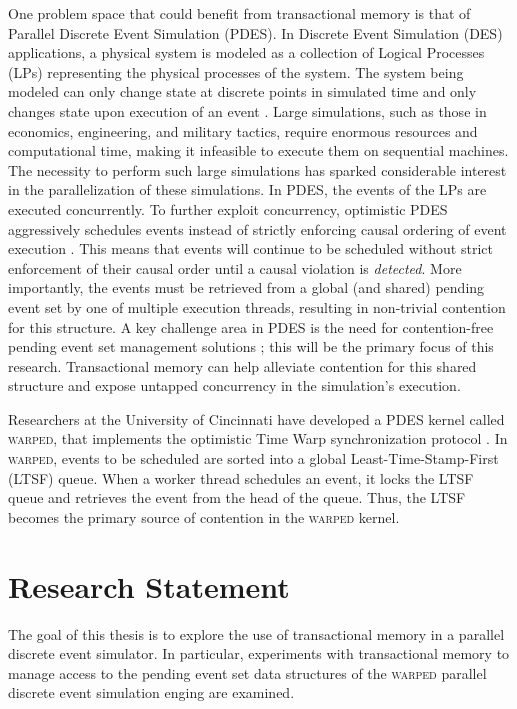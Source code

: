 \documentclass[11pt]{book}
\begin{document}
One problem space that could benefit from transactional memory is that of Parallel
Discrete Event Simulation (PDES).  In Discrete Event Simulation (DES) applications, a
physical system is modeled as a collection of Logical Processes (LPs) representing the
physical processes of the system.  The system being modeled can only change state at
discrete points in simulated time and only changes state upon execution of an event
\cite{fujimoto}.  Large simulations, such as those in economics, engineering, and military
tactics, require enormous resources and computational time, making it infeasible to
execute them on sequential machines.  The necessity to perform such large simulations has
sparked considerable interest in the parallelization of these simulations.  In PDES, the
events of the LPs are executed concurrently.  To further exploit concurrency, optimistic
PDES aggressively schedules events instead of strictly enforcing causal ordering of event
execution \cite{fujimoto,dickman_thesis}.  This means that events will continue to be
scheduled without strict enforcement of their causal order until a causal violation is
\emph{detected}.  More importantly, the events must be retrieved from a global (and
shared) pending event set by one of multiple execution threads, resulting in non-trivial
contention for this structure.  A key challenge area in PDES is the need for
contention-free pending event set management solutions \cite{dickman}; this will be the
primary focus of this research.  Transactional memory can help alleviate contention for
this shared structure and expose untapped concurrency in the simulation's execution.

Researchers at the University of Cincinnati have developed a PDES kernel called
\textsc{warped}, that implements the optimistic Time Warp synchronization protocol
\cite{jefferson-85,fujimoto}.  In \textsc{warped}, events to be scheduled are sorted into
a global Least-Time-Stamp-First (LTSF) queue.  When a worker thread schedules an event, it
locks the LTSF queue and retrieves the event from the head of the queue.  Thus, the LTSF
becomes the primary source of contention in the \textsc{warped} kernel.

\section{Research Statement}

The goal of this thesis is to explore the use of transactional memory in a parallel
discrete event simulator.  In particular, experiments with transactional memory to manage
access to the pending event set data structures of the \textsc{warped} parallel discrete
event simulation enging are examined.
\end{document}
